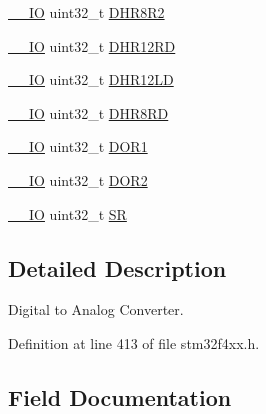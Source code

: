 \begin{DoxyCompactItemize}
\hyperlink{group___c_m_s_i_s__core__definitions_gaec43007d9998a0a0e01faede4133d6be}{\+\_\+\+\_\+\+IO} uint32\+\_\+t \hyperlink{struct_d_a_c___type_def_a4c435f0e34ace4421241cd5c3ae87fc2}{D\+H\+R8\+R2}
\item 
\hyperlink{group___c_m_s_i_s__core__definitions_gaec43007d9998a0a0e01faede4133d6be}{\+\_\+\+\_\+\+IO} uint32\+\_\+t \hyperlink{struct_d_a_c___type_def_a1590b77e57f17e75193da259da72095e}{D\+H\+R12\+RD}
\item 
\hyperlink{group___c_m_s_i_s__core__definitions_gaec43007d9998a0a0e01faede4133d6be}{\+\_\+\+\_\+\+IO} uint32\+\_\+t \hyperlink{struct_d_a_c___type_def_acc269320aff0a6482730224a4b641a59}{D\+H\+R12\+LD}
\item 
\hyperlink{group___c_m_s_i_s__core__definitions_gaec43007d9998a0a0e01faede4133d6be}{\+\_\+\+\_\+\+IO} uint32\+\_\+t \hyperlink{struct_d_a_c___type_def_a9590269cba8412f1be96b0ddb846ef44}{D\+H\+R8\+RD}
\item 
\hyperlink{group___c_m_s_i_s__core__definitions_gaec43007d9998a0a0e01faede4133d6be}{\+\_\+\+\_\+\+IO} uint32\+\_\+t \hyperlink{struct_d_a_c___type_def_aa710505be03a41981c35bacc7ce20746}{D\+O\+R1}
\item 
\hyperlink{group___c_m_s_i_s__core__definitions_gaec43007d9998a0a0e01faede4133d6be}{\+\_\+\+\_\+\+IO} uint32\+\_\+t \hyperlink{struct_d_a_c___type_def_aba9fb810b0cf6cbc1280c5c63be2418b}{D\+O\+R2}
\item 
\hyperlink{group___c_m_s_i_s__core__definitions_gaec43007d9998a0a0e01faede4133d6be}{\+\_\+\+\_\+\+IO} uint32\+\_\+t \hyperlink{struct_d_a_c___type_def_af6aca2bbd40c0fb6df7c3aebe224a360}{SR}
\end{DoxyCompactItemize}


\subsection{Detailed Description}
Digital to Analog Converter. 

Definition at line 413 of file stm32f4xx.\+h.



\subsection{Field Documentation}
\mbox{\label{struct_d_a_c___type_def_ab40c89c59391aaa9d9a8ec011dd0907a}} 
